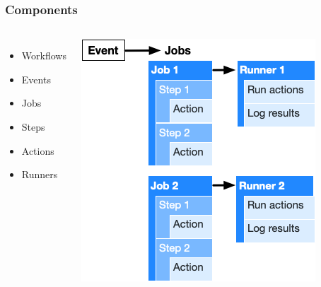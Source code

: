 \documentclass[gray]{beamer}
\begin{document}
\begin{frame}
 \frametitle{Components}

 \href{https://docs.github.com/en/free-pro-team@latest/actions/learn-github-actions/introduction-to-github-actions\#the-components-of-github-actions}{}


\begin{columns}
\begin{itemize}
\item Workflows
\item Events
\item Jobs
\item Steps
\item Actions
\item Runners
\end{itemize}
\includegraphics[width=\textwidth]{overview-actions-design.png}
\end{columns}

\end{frame}
\end{document}
